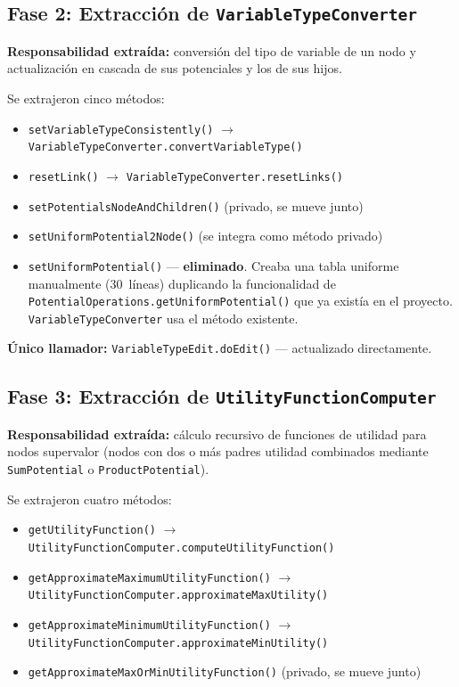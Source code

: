 \documentclass[11pt,a4paper]{article}
\newcommand{\code}[1]{\texttt{#1}}
\begin{document}
\subsection{Fase 2: Extracci\'on de \code{VariableTypeConverter}}

\textbf{Responsabilidad extra\'ida:} conversi\'on del tipo de variable
de un nodo y actualizaci\'on en cascada de sus potenciales y los de
sus hijos.

Se extrajeron cinco m\'etodos:
\begin{itemize}
  \item \code{setVariableTypeConsistently()} $\to$
        \code{VariableTypeConverter.convertVariableType()}
  \item \code{resetLink()} $\to$ \code{VariableTypeConverter.resetLinks()}
  \item \code{setPotentialsNodeAndChildren()} (privado, se mueve junto)
  \item \code{setUniformPotential2Node()} (se integra como m\'etodo
        privado)
  \item \code{setUniformPotential()} --- \textbf{eliminado}.  Creaba una
        tabla uniforme manualmente (30~l\'ineas) duplicando la
        funcionalidad de \code{PotentialOperations.getUniformPotential()}
        que ya exist\'ia en el proyecto.  \code{VariableTypeConverter}
        usa el m\'etodo existente.
\end{itemize}

\textbf{\'Unico llamador:} \code{VariableTypeEdit.doEdit()} ---
actualizado directamente.

\subsection{Fase 3: Extracci\'on de \code{UtilityFunctionComputer}}

\textbf{Responsabilidad extra\'ida:} c\'alculo recursivo de funciones de
utilidad para nodos supervalor (nodos con dos o m\'as padres utilidad
combinados mediante \code{SumPotential} o \code{ProductPotential}).

Se extrajeron cuatro m\'etodos:
\begin{itemize}
  \item \code{getUtilityFunction()} $\to$
        \code{UtilityFunctionComputer.computeUtilityFunction()}
  \item \code{getApproximateMaximumUtilityFunction()} $\to$
        \code{UtilityFunctionComputer.approximateMaxUtility()}
  \item \code{getApproximateMinimumUtilityFunction()} $\to$
        \code{UtilityFunctionComputer.approximateMinUtility()}
  \item \code{getApproximateMaxOrMinUtilityFunction()} (privado, se
        mueve junto)
\end{itemize}
\end{document}
